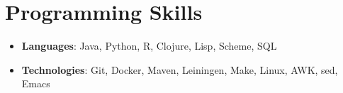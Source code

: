 \documentclass[letterpaper,10pt]{article}
\newcommand{\resumeSubHeadingListStart}{\begin{itemize}[leftmargin=*]}
\newcommand{\resumeSubHeadingListEnd}{\end{itemize}}
\begin{document}
%
\section{Programming Skills}
\resumeSubHeadingListStart
\item{
            \textbf{Languages}{: Java, Python, R, Clojure, Lisp, Scheme, SQL}
      }
\item{
            \textbf{Technologies}{: Git, Docker, Maven, Leiningen, Make, Linux, AWK, sed, Emacs}
      }
\resumeSubHeadingListEnd


\end{document}
